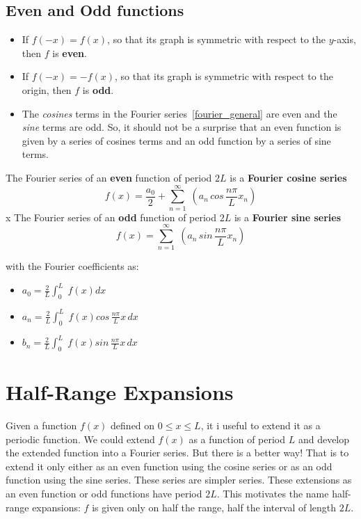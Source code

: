 \documentclass[aima331_lecturenotes_ku.tex]{subfiles}
\begin{document}
\subsection{Even and Odd functions}
\begin{itemize}
\item  If $f(-x)=f(x)$, so that its graph is symmetric with respect to the $y$-axis, then $f$ is \textbf{even}.
\item  If $f(-x)=-f(x)$, so that its graph is symmetric with respect to the origin, then $f$ is \textbf{odd}.

\item The \textit{cosines} terms in the Fourier series~\ref{fourier_general} are even and the \textit{sine} terms are odd. So, it should not be a surprise that an even function is given by a series of cosines terms and an odd function by a series of sine terms.
\end{itemize}
\begin{mdframed}
  The Fourier series of an \textbf{even} function of period $2L$ is a \textbf{Fourier cosine series}
  \begin{equation}
    \label{fourier_cosine}
    f(x)= \frac{a_0}{2} + \sum_{n=1}^{\infty} \; \left ( a_n\, cos\,\frac{n\pi}{L}x _n  \right )
  \end{equation}
x    The Fourier series of an \textbf{odd} function of period $2L$ is a \textbf{Fourier sine series}
  \begin{equation}
    \label{fourier_sine}
    f(x)= \sum_{n=1}^{\infty} \; \left ( a_n\, sin\,\frac{n\pi}{L}x _n  \right )
  \end{equation}
\end{mdframed}
with the Fourier coefficients as:
\begin{itemize}
\item $\displaystyle a_0 = \frac{2}{L} \int_0^{L} \; f(x) dx$

\item $\displaystyle a_n = \frac{2}{L} \int_0^{L} \; f(x)cos\,\frac{n\pi}{L}x \, dx$

\item $\displaystyle b_n = \frac{2}{L} \int_0^{L} \; f(x)sin\,\frac{n\pi}{L}x \, dx$
\end{itemize}

\section{Half-Range Expansions}
Given a function $f(x)$ defined on $0 \leq x \leq L$, it i useful to extend it as a periodic function. We could extend $f(x)$ as a function of period $L$ and develop the extended function into a Fourier series. But there is a better way! That is to extend it only either as an even function using the cosine series or as an odd function using the sine series. These series are simpler series. These extensions as an even function or odd functions have period $2L$. This motivates the name half-range expansions: $f$ is given only on half the range, half the interval of length $2L$.
\end{document}
